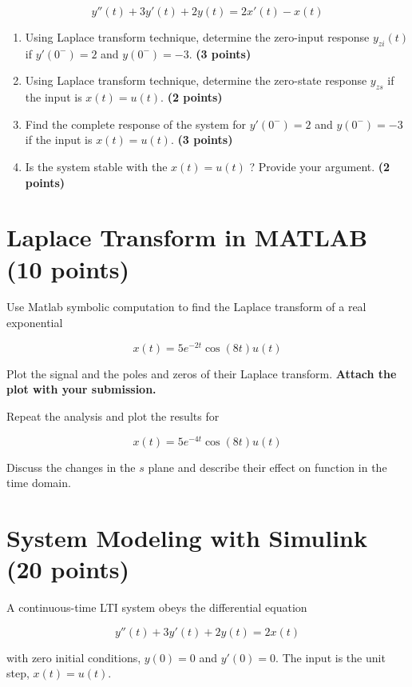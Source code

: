 \documentclass[12pt, xcolor=dvipsnames,svgnames,x11names]{article}
\begin{document}
\begin{equation}
\label{eq:Q4}
    y''(t) + 3y'(t) + 2y(t) = 2x'(t) - x(t)
\end{equation}

\begin{enumerate}
    \item Using Laplace transform technique, determine the zero-input response $y_{zi}(t)$ if $y'(0^-) = 2$ and $y(0^-) = -3$. \textbf{(3 points)}

    \item Using Laplace transform technique, determine the zero-state response $y_{zs}$  if the input is $x(t) = u(t)$. \textbf{(2 points)}

    \item Find the complete response of the system for $y'(0^-) = 2$ and $y(0^-) = -3$ if the input is $x(t) = u(t)$. \textbf{(3 points)}

  

    \item Is the system stable with the  $x(t) = u(t)$ ? Provide your argument. \textbf{(2 points)}
\end{enumerate}




\section{Laplace Transform in MATLAB (10 points)}

Use Matlab symbolic computation to find the Laplace transform of a real
exponential

$$
x(t) = 5e^{-2t}\cos(8t)u(t)
$$

Plot the signal and the poles and zeros of their Laplace transform. \textbf{Attach the plot with your submission.}

Repeat the analysis and plot the results for

$$
x(t) = 5e^{-4t}\cos(8t)u(t)
$$

Discuss the changes in the $s$ plane and describe their effect on function in the time domain.


\section{System Modeling with Simulink (20 points)}
A continuous-time LTI system obeys the differential equation

$$
y''(t) + 3y'(t) + 2y(t) = 2x(t)
$$

with zero initial conditions, $y(0) = 0$ and $y'(0) = 0$. The input is the unit step, $x(t) = u(t)$.
\end{document}
